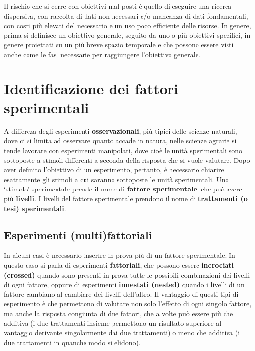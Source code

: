 \documentclass[a4paper,12pt,oneside]{book}
\begin{document}
Il rischio che si corre con obiettivi mal posti è quello di eseguire una ricerca dispersiva, con raccolta di dati non necessari e/o mancanza di dati fondamentali, con costi più elevati del necessario e un uso poco efficiente delle risorse. In genere, prima si definisce un obiettivo generale, seguito da uno o più obiettivi specifici, in genere proiettati su un più breve spazio temporale e che possono essere visti anche come le fasi necessarie per raggiungere l'obiettivo generale.

\hypertarget{identificazione-dei-fattori-sperimentali}{%
\section{Identificazione dei fattori sperimentali}\label{identificazione-dei-fattori-sperimentali}}

A differeza degli esperimenti \textbf{osservazionali}, più tipici delle scienze naturali, dove ci si limita ad osservare quanto accade in natura, nelle scienze agrarie si tende lavorare con esperimenti manipolati, dove cioè le unità sperimentali sono sottoposte a stimoli differenti a seconda della risposta che si vuole valutare.
Dopo aver definito l'obiettivo di un esperimento, pertanto, è necessario chiarire esattamente gli stimoli a cui saranno sottoposte le unità sperimentali. Uno `stimolo' sperimentale prende il nome di \textbf{fattore sperimentale}, che può avere più \textbf{livelli}. I livelli del fattore sperimentale prendono il nome di \textbf{trattamenti (o tesi) sperimentali}.

\hypertarget{esperimenti-multifattoriali}{%
\subsection{Esperimenti (multi)fattoriali}\label{esperimenti-multifattoriali}}

In alcuni casi è necessario inserire in prova più di un fattore sperimentale. In questo caso si parla di esperimenti \textbf{fattoriali}, che possono essere \textbf{incrociati (crossed)} quando sono presenti in prova tutte le possibili combinazioni dei livelli di ogni fattore, oppure di esperimenti \textbf{innestati (nested)} quando i livelli di un fattore cambiano al cambiare dei livelli dell'altro. Il vantaggio di questi tipi di esperimento è che permettono di valutare non solo l'effetto di ogni singolo fattore, ma anche la risposta congiunta di due fattori, che a volte può essere più che additiva (i due trattamenti insieme permettono un risultato superiore al vantaggio derivante singolarmente dai due trattamenti) o meno che additiva (i due trattamenti in quanche modo si elidono).
\end{document}
